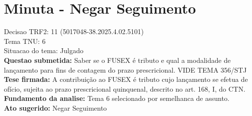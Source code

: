 \documentclass{article}
\begin{document}
\section*{Minuta - Negar Seguimento}
Decisao TRF2: 11 (5017048-38.2025.4.02.5101)\\
Tema TNU: 6\\
Situacao do tema: Julgado\\
\textbf{Questao submetida:} Saber se o FUSEX é tributo e qual a modalidade de lançamento para fins de contagem do prazo prescricional. VIDE TEMA 356/STJ\\
\textbf{Tese firmada:} A contribuição ao FUSEX é tributo cujo lançamento se efetua de ofício, sujeita ao prazo prescricional quinquenal, descrito no art. 168, I, do CTN.\\
\textbf{Fundamento da analise:} Tema 6 selecionado por semelhanca de assunto.\\
\textbf{Ato sugerido:} Negar Seguimento
\end{document}
